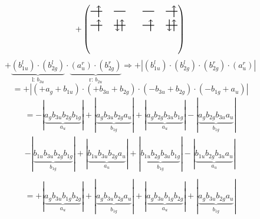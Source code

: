\documentclass{article}
\begin{document}
\vspace{0.5cm}

\[+\left(\begin{tikzpicture}
    \draw[thick] (0,0) -- (0.5,0); %
    \draw[thick] (1,0) -- (1.5,0); %
    \draw[thick] (0,-0.6) -- (0.5,-0.6); %
    \draw[thick] (1,-0.6) -- (1.5,-0.6); %
\draw[->, thick] (0.35, -0.25) -- (0.35, 0.25); 
\draw[-> , thick] (0.35, -0.85) -- (0.35, -0.35); 
 \draw[-> , thick] (1.35, -0.85) -- (1.35, -0.35); 
\draw[<- , thick] (1.15, -0.85) -- (1.15, -0.35); 
\end{tikzpicture}\qquad \begin{tikzpicture}
    \draw[thick] (0,0) -- (0.5,0); %
    \draw[thick] (1,0) -- (1.5,0); %
    \draw[thick] (0,-0.6) -- (0.5,-0.6); %
    \draw[thick] (1,-0.6) -- (1.5,-0.6); %
\draw[->, thick] (1.35, -0.25) -- (1.35, 0.25); 
\draw[-> , thick] (0.35, -0.85) -- (0.35, -0.35); 
 \draw[-> , thick] (1.35, -0.85) -- (1.35, -0.35); 
\draw[<- , thick] (1.15, -0.85) -- (1.15, -0.35); 
\end{tikzpicture}\right)\]$$+ \underbrace{(b_{1u}^{l})\cdot (b_{2g}^{l})}_{\text{l: }b_{3u}}\cdot \underbrace{(a_{u}^{r})\cdot (b_{2g}^{r})}_{\text{r: }b_{2u}}\Rightarrow +\left|(b_{1u}^{l}) \cdot (b_{2g}^{l}) \cdot (b_{2g}^{r}) \cdot (a_{u}^{r})\right|$$$$=+\left|(+a_{g}+b_{1u}) \cdot (+b_{3u}+b_{2g}) \cdot (-b_{3u}+b_{2g}) \cdot (-b_{1g}+a_{u})\right|$$\begin{multline*}
=-\left|\underbrace{a_{g} b_{3u} b_{2g} b_{1g}}_{a_{u}}\right|+\left|\underbrace{a_{g} b_{3u} b_{2g} a_{u}}_{b_{1g}}\right|+\left|\underbrace{a_{g} b_{2g} b_{3u} b_{1g}}_{a_{u}}\right|-\left|\underbrace{a_{g} b_{2g} b_{3u} a_{u}}_{b_{1g}}\right|\\
-\left|\underbrace{b_{1u} b_{3u} b_{2g} b_{1g}}_{b_{1g}}\right|+\left|\underbrace{b_{1u} b_{3u} b_{2g} a_{u}}_{a_{u}}\right|+\left|\underbrace{b_{1u} b_{2g} b_{3u} b_{1g}}_{b_{1g}}\right|-\left|\underbrace{b_{1u} b_{2g} b_{3u} a_{u}}_{a_{u}}\right|\\
\end{multline*}\begin{multline*}
=+\left|\underbrace{a_{g} b_{3u} b_{1g} b_{2g}}_{a_{u}}\right|+\left|\underbrace{a_{g} b_{3u} b_{2g} a_{u}}_{b_{1g}}\right|+\left|\underbrace{a_{g} b_{3u} b_{1g} b_{2g}}_{a_{u}}\right|+\left|\underbrace{a_{g} b_{3u} b_{2g} a_{u}}_{b_{1g}}\right|\\

\end{multline*}
\end{document}
